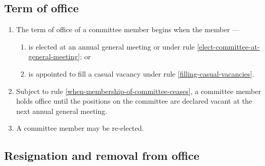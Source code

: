 \documentclass[../constitution.tex]{subfiles}
\begin{document}
\hypertarget{term-of-office}{%
\subsection{Term of office}\label{term-of-office}}

\begin{enumerate}

\item The term of office of a committee member begins when the member ---

  \begin{enumerate}
  
  \item is elected at an annual general meeting or under rule \ref{elect-committee-at-general-meeting}; or
  \item is appointed to fill a casual vacancy under rule \ref{filling-casual-vacancies}.
  \end{enumerate}
\item Subject to rule \ref{when-membership-of-committee-ceases}, a committee member holds office until the positions on the committee are declared vacant at the next annual general meeting.
\item A committee member may be re-elected.
\end{enumerate}

\hypertarget{resignation-and-removal-from-office}{%
\subsection{Resignation and removal from office}\label{resignation-and-removal-from-office}}
\end{document}
